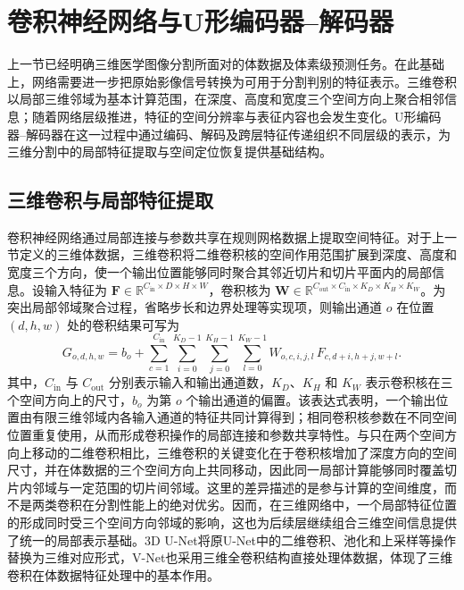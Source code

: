 \section{卷积神经网络与U形编码器--解码器}

上一节已经明确三维医学图像分割所面对的体数据及体素级预测任务。在此基础上，网络需要进一步把原始影像信号转换为可用于分割判别的特征表示。三维卷积以局部三维邻域为基本计算范围，在深度、高度和宽度三个空间方向上聚合相邻信息；随着网络层级推进，特征的空间分辨率与表征内容也会发生变化。U形编码器--解码器在这一过程中通过编码、解码及跨层特征传递组织不同层级的表示，为三维分割中的局部特征提取与空间定位恢复提供基础结构。

\subsection{三维卷积与局部特征提取}

卷积神经网络通过局部连接与参数共享在规则网格数据上提取空间特征。对于上一节定义的三维体数据，三维卷积将二维卷积核的空间作用范围扩展到深度、高度和宽度三个方向，使一个输出位置能够同时聚合其邻近切片和切片平面内的局部信息。设输入特征为 \(\mathbf{F}\in\mathbb{R}^{C_{\mathrm{in}}\times D\times H\times W}\)，卷积核为 \(\mathbf{W}\in\mathbb{R}^{C_{\mathrm{out}}\times C_{\mathrm{in}}\times K_D\times K_H\times K_W}\)。为突出局部邻域聚合过程，省略步长和边界处理等实现项，则输出通道 \(o\) 在位置 \((d,h,w)\) 处的卷积结果可写为
\begin{equation}
\label{eq:ch2-3d-convolution}
G_{o,d,h,w}=b_o+
\sum_{c=1}^{C_{\mathrm{in}}}
\sum_{i=0}^{K_D-1}
\sum_{j=0}^{K_H-1}
\sum_{l=0}^{K_W-1}
W_{o,c,i,j,l}\,
F_{c,d+i,h+j,w+l}.
\end{equation}
其中，\(C_{\mathrm{in}}\) 与 \(C_{\mathrm{out}}\) 分别表示输入和输出通道数，\(K_D\)、\(K_H\) 和 \(K_W\) 表示卷积核在三个空间方向上的尺寸，\(b_o\) 为第 \(o\) 个输出通道的偏置。该表达式表明，一个输出位置由有限三维邻域内各输入通道的特征共同计算得到；相同卷积核参数在不同空间位置重复使用，从而形成卷积操作的局部连接和参数共享特性。与只在两个空间方向上移动的二维卷积相比，三维卷积的关键变化在于卷积核增加了深度方向的空间尺寸，并在体数据的三个空间方向上共同移动，因此同一局部计算能够同时覆盖切片内邻域与一定范围的切片间邻域。这里的差异描述的是参与计算的空间维度，而不是两类卷积在分割性能上的绝对优劣。因而，在三维网络中，一个局部特征位置的形成同时受三个空间方向邻域的影响，这也为后续层继续组合三维空间信息提供了统一的局部表示基础。3D U-Net将原U-Net中的二维卷积、池化和上采样等操作替换为三维对应形式，V-Net也采用三维全卷积结构直接处理体数据，体现了三维卷积在体数据特征处理中的基本作用。\cite{cicek2016threeDunet,milletari2016vnet}

